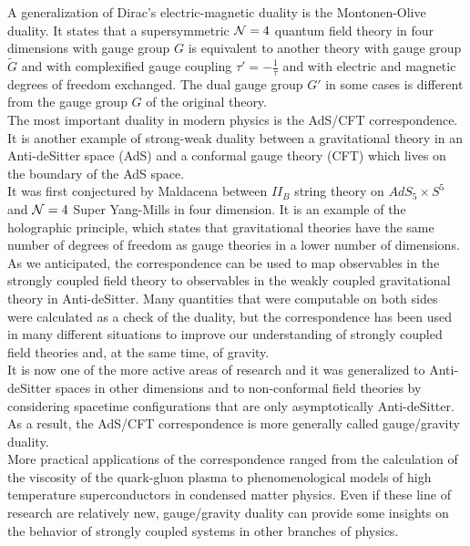 A generalization of Dirac's electric-magnetic duality is the Montonen-Olive duality.
It states that a supersymmetric  $\mathcal{N}=4$ quantum field theory in four dimensions with gauge group $G$ is equivalent to another theory with gauge group $\tilde{G}$ and with complexified gauge coupling $\tau' = - \frac{1}{\tau}$ and with electric and magnetic degrees of freedom exchanged.
The dual gauge group $G'$ in some cases is different from the gauge group $G$ of the original theory.
\\

The most important duality in modern physics is the AdS/CFT correspondence. 
It is another example of strong-weak duality between a gravitational theory in an Anti-deSitter space (AdS) and a conformal gauge theory (CFT) which lives on the boundary of the AdS space. \\
It was first conjectured by Maldacena between $II_B$ string theory on $AdS_5 \times S^5$ and $\mathcal{N}=4$ Super Yang-Mills in four dimension. 
It is an example of the holographic principle, which states that gravitational theories have the same number of degrees of freedom as gauge theories in a lower number of dimensions.\\
As we anticipated, the correspondence can be used to map observables in the strongly coupled field theory to observables in the weakly coupled gravitational theory in Anti-deSitter.
Many quantities that were computable on both sides were calculated as a check of the duality, but the correspondence has been used in many different situations to improve our understanding of strongly coupled field theories and, at the same time, of gravity. \\
It is now one of the more active areas of research and it was generalized to  Anti-deSitter spaces in other dimensions and to non-conformal field theories by considering spacetime configurations that are only asymptotically Anti-deSitter.
As a result, the AdS/CFT correspondence is more generally called gauge/gravity duality.  \\
More practical applications of the correspondence ranged from the calculation of the viscosity of the quark-gluon plasma to phenomenological models of high temperature superconductors in condensed matter physics.
Even if these line of research are relatively new, gauge/gravity duality can provide some insights on the behavior of strongly coupled systems in other branches of physics.   
\\ 

